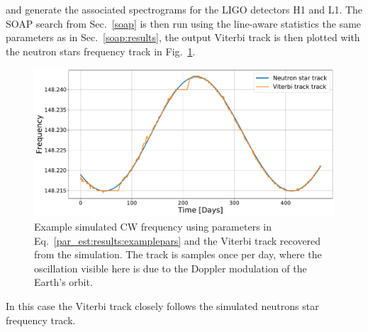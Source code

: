 and generate the associated spectrograms for the \gls{LIGO} detectors H1 and L1.
The SOAP search from Sec.~\ref{soap} is then run using the line-aware statistics the same parameters as in Sec.~\ref{soap:results}, the output Viterbi track is then plotted with the neutron stars frequency track in Fig.~\ref{par_est:results:freqtrack}.
%
\begin{figure}[ht]

    \centering
    \includegraphics[width=\linewidth]{C5_parameter/example_freqtrack.pdf}
    \caption[Frequency track of injected signal]{ Example simulated \gls{CW} frequency using parameters in Eq.~\ref{par_est:results:examplepars} and the Viterbi track recovered from the simulation. The track is samples once per day, where the oscillation visible here is due to the Doppler modulation of the Earth's orbit.}
    \label{par_est:results:freqtrack}
    
\end{figure}
%
In this case the Viterbi track closely follows the simulated neutrons star frequency track.


